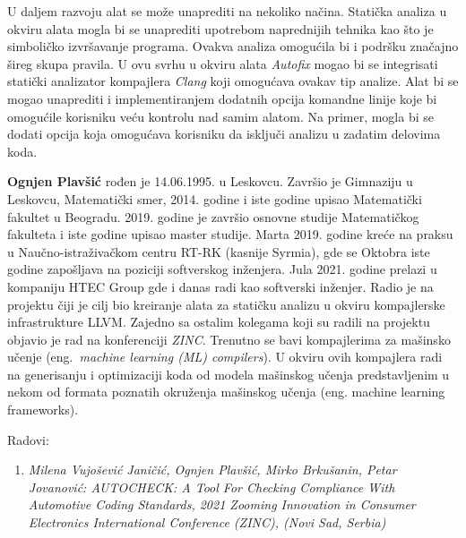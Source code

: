 \documentclass[12pt,oneside]{memoir}
\begin{document}
\par
U daljem razvoju alat se mo\v{z}e unaprediti na nekoliko na\v{c}ina. 
Stati\v{c}ka analiza u okviru alata mogla bi se unaprediti upotrebom naprednijih tehnika kao \v{s}to je simboli\v{c}ko izvr\v{s}avanje programa. Ovakva analiza
omogu\'{c}ila bi i podr\v{s}ku zna\v{c}ajno \v{s}ireg skupa pravila. U ovu svrhu u okviru alata \textit{Autofix} mogao bi se integrisati stati\v{c}ki analizator kompajlera \textit{Clang} koji omogu\'{c}ava ovakav tip analize. Alat bi se mogao unaprediti i implementiranjem dodatnih opcija komandne linije koje bi omogu\'{c}ile korisniku ve\'{c}u
kontrolu nad samim alatom. Na primer, mogla bi se dodati opcija koja omogu\'{c}ava korisniku da isklju\v{c}i analizu u zadatim delovima koda.



\literatura

\backmatter

\begin{biografija}
  \textbf{Ognjen Plavšić} rođen je 14.06.1995. u Leskovcu. Zavr\v{s}io je Gimnaziju u Leskovcu, Matemati\v{c}ki smer, 2014. godine
  i iste godine upisao Matemati\v{c}ki fakultet u Beogradu. 2019. godine je zavr\v{s}io osnovne studije Matemati\v{c}kog fakulteta i iste
  godine upisao master studije. Marta 2019. godine kre\'{c}e na praksu u Nau\v{c}no-istra\v{z}iva\v{c}kom centru RT-RK (kasnije Syrmia), gde
  se Oktobra iste godine zapo\v{s}ljava na poziciji softverskog in\v{z}enjera. Jula 2021. godine prelazi u kompaniju HTEC Group gde i danas
  radi kao softverski in\v{z}enjer. Radio je na projektu \v{c}iji je cilj bio kreiranje alata za stati\v{c}ku analizu u okviru kompajlerske infrastrukture
  LLVM. Zajedno sa ostalim kolegama koji su radili na projektu objavio je rad na konferenciji \textit{ZINC}. Trenutno se bavi kompajlerima za ma\v{s}insko u\v{c}enje
  (eng.~\textit{machine learning (ML) compilers}). U okviru ovih kompajlera radi na generisanju i optimizaciji koda od modela ma\v{s}inskog u\v{c}enja predstavljenim u nekom od formata poznatih okru\v{z}enja ma\v{s}inskog u\v{c}enja (eng. machine learning frameworks). \par
  Radovi:
  \begin{enumerate}
    \item{\textit{Milena Vujo\v{s}evi\'{c} Jani\v{c}i\'{c}, Ognjen Plav\v{s}i\'{c}, Mirko Brku\v{s}anin, Petar Jovanovi\'{c}: AUTOCHECK: A Tool For Checking Compliance With Automotive Coding Standards, 2021 Zooming Innovation in Consumer Electronics International Conference (ZINC), (Novi Sad, Serbia)}
    }
    
  \end{enumerate}

\end{biografija}
\end{document}
